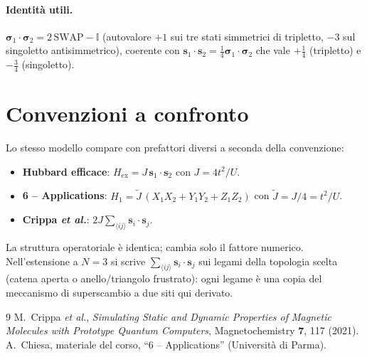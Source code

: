 \documentclass[11pt,a4paper]{article}
\renewcommand{\vec}[1]{\boldsymbol{#1}}
\newcommand{\sv}{\vec{s}}
\theoremstyle{definition}
\theoremstyle{remark}
\begin{document}
\paragraph{Identità utili.} $\boldsymbol{\sigma}_1\!\cdot\boldsymbol{\sigma}_2=2\,\mathrm{SWAP}-\mathbb{I}$
(autovalore $+1$ sui tre stati simmetrici di tripletto, $-3$ sul singoletto antisimmetrico), coerente con
$\sv_1\!\cdot\sv_2=\tfrac14\boldsymbol{\sigma}_1\!\cdot\boldsymbol{\sigma}_2$ che vale $+\tfrac14$
(tripletto) e $-\tfrac34$ (singoletto).

\section{Convenzioni a confronto}
\label{app:conv}

Lo stesso modello compare con prefattori diversi a seconda della convenzione:
\begin{itemize}[nosep]
\item \textbf{Hubbard efficace}: $H_{\mathrm{ex}}=J\,\sv_1\!\cdot\sv_2$ con $J=4t^2/U$.
\item \textbf{6 -- Applications}: $H_1=\tilde J\,(X_1X_2+Y_1Y_2+Z_1Z_2)$ con $\tilde J=J/4=t^2/U$.
\item \textbf{Crippa \textit{et al.}}: $2J\sum_{\langle ij\rangle}\sv_i\!\cdot\sv_j$.
\end{itemize}
La struttura operatoriale è identica; cambia solo il fattore numerico. Nell'estensione a $N=3$ si scrive
$\sum_{\langle ij\rangle}\sv_i\!\cdot\sv_j$ sui legami della topologia scelta (catena aperta o
anello/triangolo frustrato): ogni legame è una copia del meccanismo di superscambio a due siti qui
derivato.

\begin{thebibliography}{9}
 M.~Crippa \textit{et al.}, \emph{Simulating Static and Dynamic Properties of Magnetic
Molecules with Prototype Quantum Computers}, Magnetochemistry \textbf{7}, 117 (2021).
 A.~Chiesa, materiale del corso, ``6 -- Applications'' (Università di Parma).
\end{thebibliography}
\end{document}
